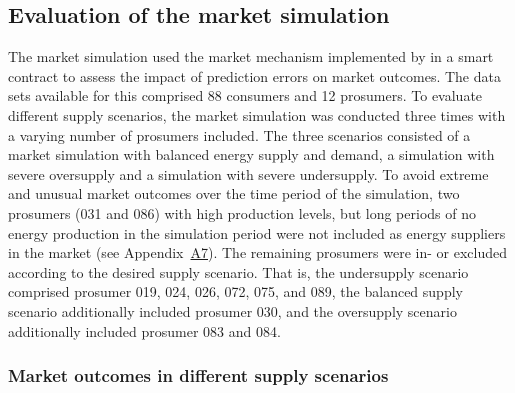 


\subsection{Evaluation of the market simulation}\label{Sec:Results;Subsec:Simulation}

The market simulation used the market mechanism implemented by \citet{Mengelkamp:2018a} in a smart contract to assess the impact of prediction errors on market outcomes. The data sets available for this comprised 88 consumers and 12 prosumers. To evaluate different supply scenarios, the market simulation was conducted three times with a varying number of prosumers included. The three scenarios consisted of a market simulation with balanced energy supply and demand, a simulation with severe oversupply and a simulation with severe undersupply. To avoid extreme and unusual market outcomes over the time period of the simulation, two prosumers (031 and 086) with high production levels, but long periods of no energy production in the simulation period were not included as energy suppliers in the market (see Appendix~\hyperlink{AppA7:Figures:producer_all}{A7}). The remaining prosumers were in- or excluded according to the desired supply scenario. That is, the undersupply scenario comprised prosumer 019, 024, 026, 072, 075, and 089, the balanced supply scenario additionally included prosumer 030, and the oversupply scenario additionally included prosumer 083 and 084.

\subsubsection{Market outcomes in different supply scenarios}

